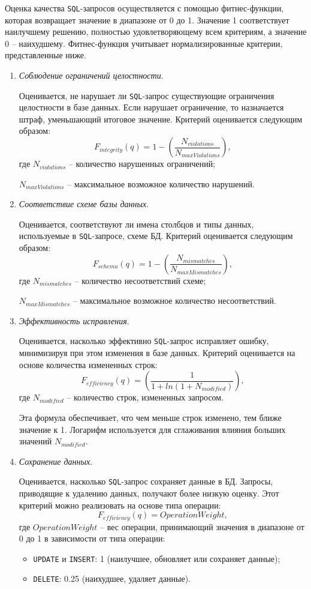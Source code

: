 \documentclass[master,paper]{pmk-graduate}
\begin{document}
Оценка качества \texttt{SQL}-запросов осуществляется с помощью фитнес-функции, которая возвращает значение в диапазоне от 0 до 1. Значение 1 соот\-ветствует наилучшему решению, полностью удовлетворяющему всем критериям, а значение 0 – наихудшему. Фитнес-функция учитывает нормализированные критерии, представленные ниже.
\begin{enumerate}
	\item \textit{Соблюдение ограничений целостности}.
	
	Оценивается, не нарушает ли \texttt{SQL}-запрос существующие ограничения целостности в базе данных. Если нарушает ограничение, то назна\-чается штраф, уменьшающий итоговое значение. Критерий оценивается сле\-дующим образом:
	$$F_{integrity}(q)=1-\left(\frac{N_{violations}}{N_{maxViolations}}\right),$$
	где $N_{violations}$ -- количество нарушенных ограничений;
	
	$N_{maxViolations}$ -- максимальное возможное количество нарушений.
	
	\item \textit{Соответствие схеме базы данных}.
	
	Оценивается, соответствуют ли имена столбцов и типы данных, используемые в \texttt{SQL}-запросе, схеме БД. Критерий оценивается следующим образом:
	$$F_{schema}(q)=1-\left(\frac{N_{mismatches}}{N_{maxMismatches}}\right),$$
	где $N_{mismatches}$ -- количество несоответствий схеме;
	
	$N_{maxMismatches}$ -- максимальное возможное количество несоответствий.
	
	\item \textit{Эффективность исправления}.
	
	Оценивается, насколько эффективно \texttt{SQL}-запрос исправляет ошибку, минимизируя при этом изменения в базе данных. Критерий оценивает\-ся на основе количества измененных строк:
	$$F_{efficiency}(q)=\left(\frac{1}{1+ln(1+N_{modified})}\right),$$
	где $N_{modified}$ -- количество строк, измененных запросом.
	
	Эта формула обеспечивает, что чем меньше строк изменено, тем ближе значение к 1. Логарифм используется для сглаживания влияния больших значений $N_{modified}$.
	
	\item \textit{Сохранение данных}.
	
	Оценивается, насколько \texttt{SQL}-запрос сохраняет данные в БД. Запросы, приводящие к удалению данных, получают более низкую оценку. Этот критерий можно реализовать на основе типа операции:
	$$F_{efficiency}(q)=OperationWeight,$$
	где $OperationWeight$ -- вес операции, принимающий значения в диапазоне от 0 до 1 в зависимости от типа операции:
	\begin{itemize}
		\item \texttt{UPDATE} и \texttt{INSERT}: 1 (наилучшее, обновляет или сохраняет данные);
		\item \texttt{DELETE}: 0.25 (наихудшее, удаляет данные).
	\end{itemize}
	

\end{enumerate}
\end{document}
